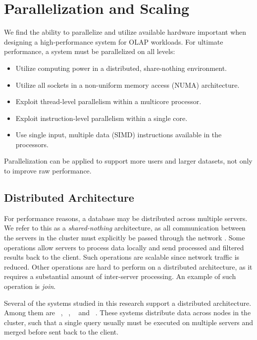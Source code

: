 \chapter{Parallelization and Scaling}
\label{chap:Parallelization and Scaling}
We find the ability to parallelize and utilize available hardware important when designing a high-performance system for OLAP workloads. For ultimate performance, a system must be parallelized on all levels:

\begin{itemize}
  \item Utilize computing power in a distributed, share-nothing environment.
  \item Utilize all sockets in a non-uniform memory access (NUMA) architecture.
  \item Exploit thread-level parallelism within a multicore processor.
  \item Exploit instruction-level parallelism within a single core.
  \item Use single input, multiple data (SIMD) instructions available in the processors.
\end{itemize}

Parallelization can be applied to support more users and larger datasets, not only to improve raw performance.

\newpage

\section{Distributed Architecture}
\label{sec:Distributed Architecture}
For performance reasons, a database may be distributed across multiple servers. We refer to this as a \textit{shared-nothing} architecture, as all communication between the servers in the cluster must explicitly be passed through the network \cite{DeWitt1992-ki}. Some operations allow servers to process data locally and send processed and filtered results back to the client. Such operations are scalable since network traffic is reduced. Other operations are hard to perform on a distributed architecture, as it requires a substantial amount of inter-server processing. An example of such operation is \textit{join}.


Several of the systems studied in this research support a distributed architecture. Among them are \oracle~\cite{Mukherjee2015-ul}, \cstore~\cite{Stonebraker2005-qz}, \saph~\cite{Farber2012-vh} and \exasol~\cite{Exasol2014-xh}. These systems distribute data across nodes in the cluster, such that a single query usually must be executed on multiple servers and merged before sent back to the client.

